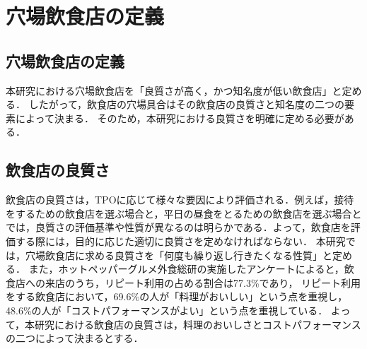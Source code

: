 \chapter{穴場飲食店の定義}

\label{chap:quality}

\section{穴場飲食店の定義}
本研究における穴場飲食店を「良質さが高く，かつ知名度が低い飲食店」と定める．
したがって，飲食店の穴場具合はその飲食店の良質さと知名度の二つの要素によって決まる．
そのため，本研究における良質さを明確に定める必要がある．

\section{飲食店の良質さ}
飲食店の良質さは，TPOに応じて様々な要因により評価される．例えば，接待をするための飲食店を選ぶ場合と，平日の昼食をとるための飲食店を選ぶ場合とでは，良質さの評価基準や性質が異なるのは明らかである．よって，飲食店を評価する際には，目的に応じた適切に良質さを定めなければならない．
本研究では，穴場飲食店に求める良質さを「何度も繰り返し行きたくなる性質」と定める．
また，ホットペッパーグルメ外食総研の実施したアンケートによると，飲食店への来店のうち，リピート利用の占める割合は77.3\%であり，
リピート利用をする飲食店において，69.6\%の人が「料理がおいしい」という点を重視し，48.6\%の人が「コストパフォーマンスがよい」という点を重視している．
よって，本研究における飲食店の良質さは，料理のおいしさとコストパフォーマンスの二つによって決まるとする．

